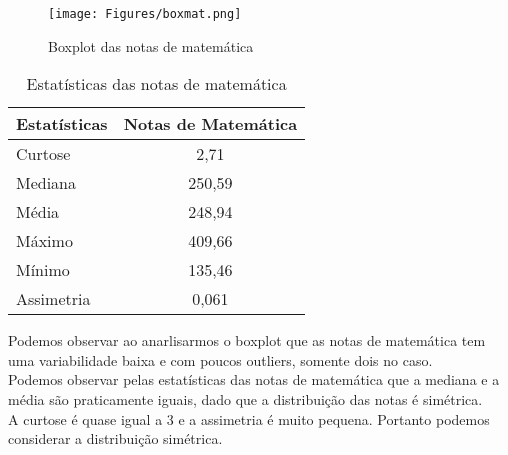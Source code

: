\documentclass[
	12pt,				%
	openright,			%
	twoside,			%
	a4paper,			%
	english,			%
	french,				%
	spanish,			%
	brazil,				%
	]{abntex2}
\begin{document}
 \begin{figure}[h!]
    \centering
    \texttt{[image: Figures/boxmat.png]}
    \caption{Boxplot das notas de matemática}
    \label{fig:exemplo}
\end{figure}
\begin{table}[h!]
   \centering
   \caption{Estatísticas das notas de matemática}
\begin{tabular}{|l|c|}
\hline
Estatísticas & \multicolumn{1}{l|}{Notas de Matemática} \\ \hline
Curtose      & 2,71                                     \\ \hline
Mediana      & 250,59                                   \\ \hline
Média        & 248,94                                   \\ \hline
Máximo       & 409,66                                   \\ \hline
Mínimo       & 135,46                                   \\ \hline
Assimetria   & 0,061                                    \\ \hline
\end{tabular}
\end{table}
Podemos observar ao anarlisarmos o boxplot que as notas de matemática tem uma variabilidade
baixa e com poucos outliers, somente dois no caso. \\
Podemos observar pelas estatísticas das notas de matemática que a mediana e a média são
praticamente iguais, dado que a distribuição das notas é simétrica. \\
A curtose é quase igual a 3 e a assimetria é muito pequena. Portanto podemos considerar
a distribuição simétrica.
\clearpage
\end{document}
